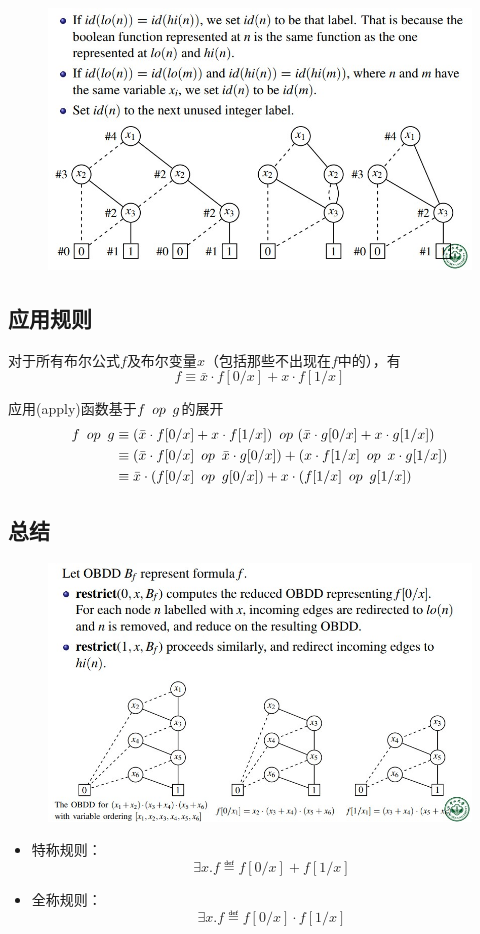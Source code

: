 \begin{figure}[H]
\centering
\includegraphics[width=0.8\linewidth]{fig/reduce_alg.jpg}
\end{figure}

\subsection{应用规则}
\begin{definition}
对于所有布尔公式$f$及布尔变量$x$（包括那些不出现在$f$中的），有
\[f\equiv\bar{x}\cdot f[0/x]+x\cdot f[1/x]\]
\end{definition}
应用(apply)函数基于$f \ \mathop{op}\  g$的展开
\[\begin{aligned}
f \ \mathop{op}\  g &\equiv(\bar{x}\cdot f[0/x]+x\cdot f[1/x])\ \mathop{op}\ (\bar{x}\cdot g[0/x]+x\cdot g[1/x])\\
&\equiv(\bar{x}\cdot f[0/x]\ \mathop{op}\ \bar{x}\cdot g[0/x])+(x\cdot f[1/x]\ \mathop{op}\  x\cdot g[1/x])\\
&\equiv\bar{x}\cdot(f[0/x]\ \mathop{op}\  g[0/x])+x\cdot(f[1/x]\ \mathop{op}\  g[1/x])
\end{aligned}\]

\subsection{总结}
\begin{figure}[H]
\centering
\includegraphics[width=0.8\linewidth]{fig/restrict_alg.jpg}
\end{figure}
\begin{itemize}
\item 特称规则：
\[\exists x.f\eqdef f[0/x]+f[1/x]\]
\item 全称规则：
\[\exists x.f\eqdef f[0/x]\cdot f[1/x]\]
\end{itemize}

